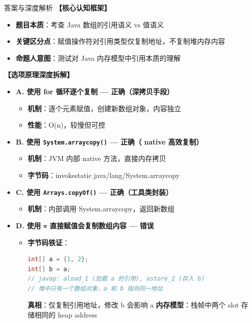 \documentclass[12pt, a4paper]{ctexart}
\newcommand{\code}[1]{\texttt{#1}}
\begin{document}
\begin{enumerate}[label=\textbf{\arabic*.}, leftmargin=*, itemsep=1.5em]
\begin{bluebox}{答案与深度解析}
		      \textbf{【核心认知框架】}
		      \begin{itemize}[leftmargin=*, nosep]
			      \item \textbf{题目本质}：考查 Java 数组的引用语义 vs 值语义
			      \item \textbf{关键区分点}：赋值操作符对引用类型仅复制地址，不复制堆内存内容
			      \item \textbf{命题人意图}：测试对 Java 内存模型中引用本质的理解
		      \end{itemize}

		      \textbf{【选项原理深度拆解】}
		      \begin{itemize}[leftmargin=*, nosep]
			      \item \textbf{A. 使用 for 循环逐个复制 — 正确（深拷贝手段）}
			            \begin{itemize}[leftmargin=*, nosep]
				            \item \textbf{机制}：逐个元素赋值，创建新数组对象，内容独立
				            \item \textbf{性能}：O(n)，较慢但可控
			            \end{itemize}
			      \item \textbf{B. 使用 \code{System.arraycopy()} — 正确（ native 高效复制）}
			            \begin{itemize}[leftmargin=*, nosep]
				            \item \textbf{机制}：JVM 内部 native 方法，直接内存拷贝
				            \item \textbf{字节码}：invokestatic java/lang/System.arraycopy
			            \end{itemize}
			      \item \textbf{C. 使用 \code{Arrays.copyOf()} — 正确（工具类封装）}
			            \begin{itemize}[leftmargin=*, nosep]
				            \item \textbf{机制}：内部调用 System.arraycopy，返回新数组
			            \end{itemize}
			      \item \textbf{D. 使用 \code{=} 直接赋值会复制数组内容 — 错误}
			            \begin{itemize}[leftmargin=*, nosep]
				            \item \textbf{字节码铁证}：
				                  \begin{lstlisting}[language=Java]
int[] a = {1, 2};
int[] b = a; 
// javap: aload_1 (加载 a 的引用), astore_2 (存入 b)
// 堆中只有一个数组对象，a 和 b 指向同一地址
        \end{lstlisting}
				                  \textbf{真相}：仅复制引用地址，修改 b 会影响 a
				                  \textbf{内存模型}：栈帧中两个 slot 存储相同的 heap address
			            \end{itemize}
		      \end{itemize}


\end{bluebox}
\end{enumerate}
\end{document}
